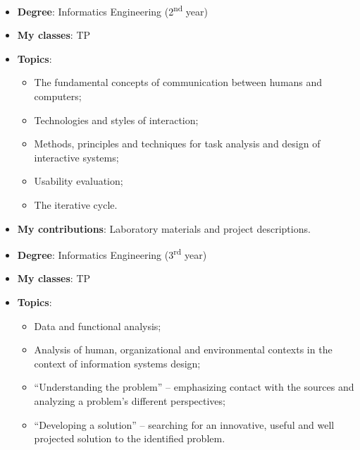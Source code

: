 \begin{itemize}
    \item \textbf{Degree}: Informatics Engineering (2\textsuperscript{nd} year)
    \item \textbf{My classes}: TP
    \item \textbf{Topics}:
    \begin{itemize}
        \item The fundamental concepts of communication between humans and computers;
        \item Technologies and styles of interaction;
        \item Methods, principles and techniques for task analysis and design of interactive systems;
        \item Usability evaluation;
        \item The iterative cycle.
    \end{itemize}
    \item \textbf{My contributions}: Laboratory materials and project descriptions.
\end{itemize}

\begin{itemize}
    \item \textbf{Degree}: Informatics Engineering (3\textsuperscript{rd} year)
    \item \textbf{My classes}: TP
    \item \textbf{Topics}:
    \begin{itemize}
        \item Data and functional analysis;
        \item Analysis of human, organizational and environmental contexts in the context of information systems design;
        \item ``Understanding the problem'' -- emphasizing contact with the sources and analyzing a problem's different perspectives;
        \item ``Developing a solution'' -- searching for an innovative, useful and well projected solution to the identified problem.
    \end{itemize}
\end{itemize}


